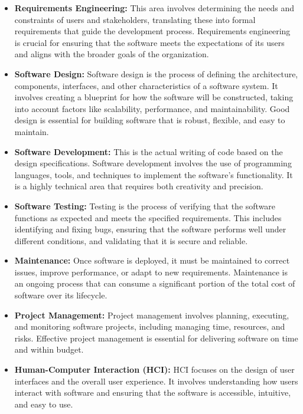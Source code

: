 \begin{refsection}
\begin{multicols}{2}
{\begin{itemize}
    \item \textbf{Requirements Engineering:} This area involves determining the needs and constraints of users and stakeholders, translating these into formal requirements that guide the development process. Requirements engineering is crucial for ensuring that the software meets the expectations of its users and aligns with the broader goals of the organization.
    \item \textbf{Software Design:} Software design is the process of defining the architecture, components, interfaces, and other characteristics of a software system. It involves creating a blueprint for how the software will be constructed, taking into account factors like scalability, performance, and maintainability. Good design is essential for building software that is robust, flexible, and easy to maintain.
    \item \textbf{Software Development:} This is the actual writing of code based on the design specifications. Software development involves the use of programming languages, tools, and techniques to implement the software's functionality. It is a highly technical area that requires both creativity and precision.
    \item \textbf{Software Testing:} Testing is the process of verifying that the software functions as expected and meets the specified requirements. This includes identifying and fixing bugs, ensuring that the software performs well under different conditions, and validating that it is secure and reliable.
    \item \textbf{Maintenance:} Once software is deployed, it must be maintained to correct issues, improve performance, or adapt to new requirements. Maintenance is an ongoing process that can consume a significant portion of the total cost of software over its lifecycle.
    \item \textbf{Project Management:} Project management involves planning, executing, and monitoring software projects, including managing time, resources, and risks. Effective project management is essential for delivering software on time and within budget.
    \item \textbf{Human-Computer Interaction (HCI):} HCI focuses on the design of user interfaces and the overall user experience. It involves understanding how users interact with software and ensuring that the software is accessible, intuitive, and easy to use.
\end{itemize}

}
\end{multicols}
\end{refsection}

